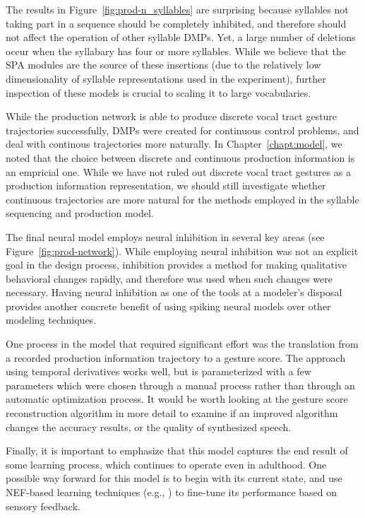 The results in Figure~\ref{fig:prod-n_syllables}
are surprising because syllables
not taking part in a sequence
should be completely inhibited,
and therefore should not affect the
operation of other syllable DMPs.
Yet, a large number of deletions
occur when the syllabary has
four or more syllables.
While we believe that the SPA modules
are the source of these insertions
(due to the relatively low
dimensionality of syllable representations
used in the experiment),
further inspection of these models
is crucial to scaling it to large vocabularies.

While the production network is able to produce
discrete vocal tract gesture trajectories successfully,
DMPs were created for continuous control problems,
and deal with continous trajectories
more naturally.
In Chapter~\ref{chapt:model},
we noted that the choice between discrete
and continuous production information
is an empricial one.
While we have not ruled out discrete
vocal tract gestures
as a production information representation,
we should still investigate whether
continuous trajectories are
more natural for the methods
employed in the syllable sequencing and production model.

The final neural model employs neural inhibition
in several key areas
(see Figure~\ref{fig:prod-network}).
While employing neural inhibition was not
an explicit goal in the design process,
inhibition provides a method for
making qualitative behavioral changes rapidly,
and therefore was used when such changes
were necessary.
Having neural inhibition
as one of the tools
at a modeler's disposal
provides another concrete benefit
of using spiking neural models
over other modeling techniques.

One process in the model that
required significant effort
was the translation from
a recorded production information trajectory
to a gesture score.
The approach using temporal derivatives
works well,
but is parameterized with a few parameters
which were chosen through a manual process
rather than through an
automatic optimization process.
It would be worth looking at the
gesture score reconstruction algorithm
in more detail to examine if
an improved algorithm changes
the accuracy results,
or the quality of synthesized speech.

Finally, it is important to emphasize that
this model captures the end result
of some learning process,
which continues to operate
even in adulthood.
One possible way forward for this model
is to begin with its current state,
and use NEF-based learning techniques
(e.g., \citealt{macneil2011,bekolay2013a})
to fine-tune its performance based on
sensory feedback.

